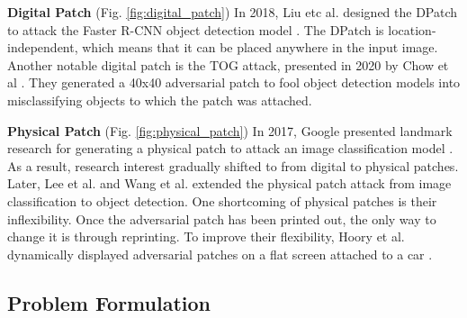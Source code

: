 \textbf{Digital Patch} (Fig. \ref{fig:digital_patch}) In 2018, Liu etc al. designed the DPatch \citep{liu2018dpatch} to attack the Faster R-CNN object detection model \citep{ren2015faster}. The DPatch is location-independent, which means that it can be placed anywhere in the input image. Another notable digital patch is the TOG attack, presented in 2020 by Chow et al \citep{chow2020adversarial}. They generated a 40x40 adversarial patch to fool object detection models into misclassifying objects to which the patch was attached.

\textbf{Physical Patch} (Fig. \ref{fig:physical_patch}) In 2017, Google presented landmark research for generating a physical patch to attack an image classification model \citep{brown2017patch}. As a result, research interest gradually shifted to from digital to physical patches. Later, Lee et al. \citep{lee2019physical} and Wang et al. \citep{wang2021daedalus} extended the physical patch attack from image classification to object detection. One shortcoming of physical patches is their inflexibility. Once the adversarial patch has been printed out, the only way to change it is through reprinting. To improve their flexibility, Hoory et al. dynamically displayed adversarial patches on a flat screen attached to a car \citep{hoory2020dynamic}.




\subsection{Problem Formulation} 

